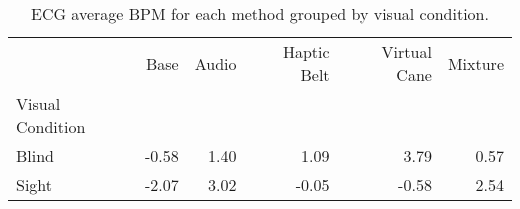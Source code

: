 
\begin{table}[!htb]
\centering
\caption{ECG average BPM for each method grouped by visual condition.}
\label{tab:ecg_bpm_average_group}
\begin{tabular}{lrrrrr}
\toprule
{} &   Base & Audio & Haptic Belt & Virtual Cane & Mixture \\
Visual Condition &        &       &             &              &         \\
\midrule
Blind            &  -0.58 &  1.40 &        1.09 &         3.79 &    0.57 \\
Sight            &  -2.07 &  3.02 &       -0.05 &        -0.58 &    2.54 \\
\bottomrule
\end{tabular}
\end{table}

